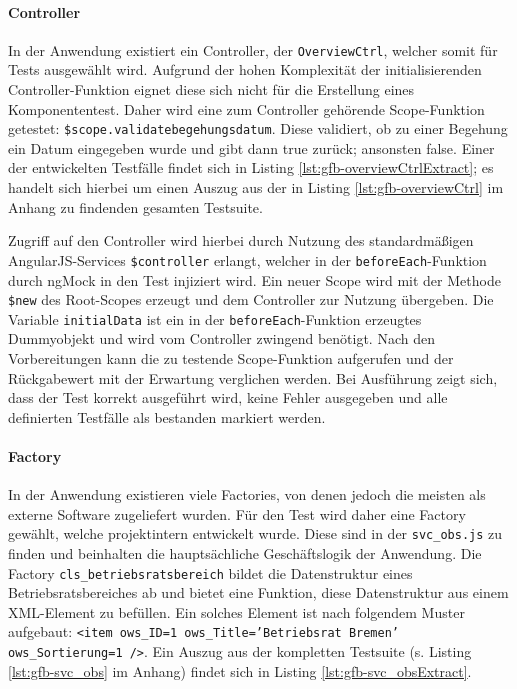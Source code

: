 \paragraph{Controller}
In der Anwendung existiert ein Controller, der \texttt{OverviewCtrl}, welcher somit für Tests ausgewählt wird. Aufgrund der hohen Komplexität der initialisierenden Controller-Funktion eignet diese sich nicht für die Erstellung eines Komponententest. Daher wird eine zum Controller gehörende Scope-Funktion getestet: \texttt{\$scope.validatebegehungsdatum}. Diese validiert, ob zu einer Begehung ein Datum eingegeben wurde und gibt dann true zurück; ansonsten false. Einer der entwickelten Testfälle findet sich in Listing \ref{lst:gfb-overviewCtrlExtract}; es handelt sich hierbei um einen Auszug aus der in Listing \ref{lst:gfb-overviewCtrl} im Anhang zu findenden gesamten Testsuite.

\begin{figure}[H]
	
\end{figure}

Zugriff auf den Controller wird hierbei durch Nutzung des standardmäßigen AngularJS-Services \texttt{\$controller} erlangt\cite{angular-controllerAPI}, welcher in der \texttt{beforeEach}-Funktion durch ngMock in den Test injiziert wird. Ein neuer Scope wird mit der Methode \texttt{\$new} des Root-Scopes erzeugt und dem Controller zur Nutzung übergeben. Die Variable \texttt{initialData} ist ein in der \texttt{beforeEach}-Funktion erzeugtes Dummyobjekt und wird vom Controller zwingend benötigt. Nach den Vorbereitungen kann die zu testende Scope-Funktion aufgerufen und der Rückgabewert mit der Erwartung verglichen werden. Bei Ausführung zeigt sich, dass der Test korrekt ausgeführt wird, keine Fehler ausgegeben und alle definierten Testfälle als bestanden markiert werden.

\paragraph{Factory}
In der Anwendung existieren viele Factories, von denen jedoch die meisten als externe Software zugeliefert wurden. Für den Test wird daher eine Factory gewählt, welche projektintern entwickelt wurde. Diese sind in der \texttt{svc\_obs.js} zu finden und beinhalten die hauptsächliche Geschäftslogik der Anwendung. Die Factory \texttt{cls\_betriebsratsbereich} bildet die Datenstruktur eines Betriebsratsbereiches ab und bietet eine Funktion, diese Datenstruktur aus einem XML-Element zu befüllen. Ein solches Element ist nach folgendem Muster aufgebaut: \texttt{<item ows\_ID=1 ows\_Title='Betriebsrat Bremen' ows\_Sortierung=1 />}. Ein Auszug aus der kompletten Testsuite (s. Listing \ref{lst:gfb-svc_obs} im Anhang) findet sich in Listing \ref{lst:gfb-svc_obsExtract}.


